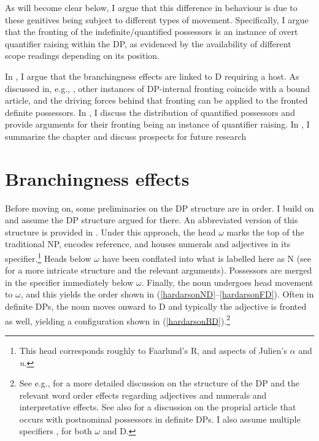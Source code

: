 \documentclass[output=paper]{langscibook}
\begin{document}
As will become clear below, I argue that this difference in behaviour is due to these genitives being subject to different types of movement. Specifically, I argue that the fronting of the indefinite/quantified possessors is an instance of overt quantifier raising within the DP, as evidenced by the availability of different scope readings depending on its position.

In , I argue that the branchingness effects are linked to D requiring a host. As discussed in, e.g., \citet{Hardarson:2016wd}, other instances of DP-internal fronting coincide with a bound article, and the driving forces behind that fronting can be applied to the fronted definite possessors. In , I discuss the distribution of quantified possessors and provide arguments for their fronting being an instance of quantifier raising. In , I summarize the chapter and discuss prospects for future research

\section{Branchingness effects}
\label{hardarsonsec:branches}

Before moving on, some preliminaries on the DP structure are in order. I build on \citet{Hardarson:2016wd} and assume the DP structure argued for there. An abbreviated version of this structure is provided in . Under this approach, the head $\omega$ marks the top of the traditional NP, encodes reference, and houses numerals and adjectives in its specifier.\footnote{This head corresponds roughly to Faarlund's \citeyearpar{Faarlund:2004,Faarlund:2009tq} R, and aspects of Julien's \citeyearpar{Julien:2003wu,Julien:2005wh} $\alpha$ and \textit{n}.} Heads below $\omega$ have been conflated into what is labelled here as N (see \citealt{Hardarson:2016wd} for a more intricate structure and the relevant arguments). Possessors are merged in the specifier immediately below $\omega$. Finally, the noun undergoes head movement to $\omega$, and this yields the order shown in (\ref{hardarsonND}--\ref{hardarsonFD}). Often in definite DPs, the noun moves onward to D and typically the adjective is fronted as well, yielding a configuration shown in (\ref{hardarsonBD}).\footnote{See e.g., \citet{Magnusson:1984ue,HAS:1993,Sigurdsson:2006wn,Pfaff:2015tp,Ingason:2016wv,Hardarson:2016wd} for a more detailed discussion on the structure of the DP and the relevant word order effects regarding adjectives and numerals and interpretative effects. See also \citet{Sigurdsson:2006wn} for a discussion on the proprial article that occurs with postnominal possessors in definite DPs. I also assume multiple specifiers \citep[e.g.,][]{Chomsky:1995uq,Lahne:2009va}, for both $\omega$ and D.}
\end{document}

